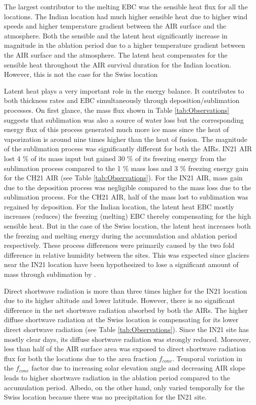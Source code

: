 \documentclass[utf8]{frontiersSCNS} %
\begin{document}
The largest contributor to the melting EBC was the sensible heat flux for all the locations. The Indian location
had much higher sensible heat due to higher wind speeds and higher temperature gradient between the AIR surface
and the atmosphere. Both the sensible and the latent heat significantly increase in magnitude in the ablation
period due to a higher temperature gradient between the AIR surface and the atmosphere. The latent heat
compensates for the sensible heat throughout the AIR survival duration for the Indian location. However, this is
not the case for the Swiss location

Latent heat plays a very important role in the energy balance. It contributes to both thickness rates and EBC
simultaneously through deposition/sublimation processes. On first glance, the mass flux shown in Table
\ref{tab:Observations} suggests that sublimation was also a source of water loss but the corresponding energy
flux of this process generated much more ice mass since the heat of vaporization is around nine times higher
than the heat of fusion. The magnitude of the sublimation process was significantly different for both the AIRs.
IN21 AIR lost 4 \% of its mass input but gained 30 \% of its freezing energy from the sublimation process
compared to the 1 \% mass loss and 3 \% freezing energy gain for the CH21 AIR (see Table
\ref{tab:Observations}). For the IN21 AIR, mass gain due to the deposition process was negligible compared to
the mass loss due to the sublimation process. For the CH21 AIR, half of the mass lost to sublimation was
regained by deposition. For the Indian location, the latent heat EBC mostly increases (reduces) the freezing
(melting) EBC thereby compensating for the high sensible heat. But in the case of the Swiss location, the latent
heat increases both the freezing and melting energy during the accumulation and ablation period respectively.
These process differences were primarily caused by the two fold difference in relative humidity between the
sites.  This was expected since glaciers near the IN21 location have been hypothesized to lose a significant
amount of mass through sublimation by \cite{azam_2018}.

Direct shortwave radiation is more than three times higher for the IN21 location due to its higher altitude and
lower latitude. However, there is no significant difference in the net shortwave radiation absorbed by both the
AIRs. The higher diffuse shortwave radiation at the Swiss location is compensating for its lower direct
shortwave radiation (see Table \ref{tab:Observations}). Since the IN21 site has mostly clear days, its diffuse
shortwave radiation was strongly reduced. Moreover, less than half of the AIR surface area was exposed to direct
shortwave radiation flux for both the locations due to the area fraction $f_{cone}$. Temporal variation in the
$f_{cone}$ factor due to increasing solar elevation angle and decreasing AIR slope leads to higher shortwave
radiation in the ablation period compared to the accumulation period. Albedo, on the other hand, only varied
temporally for the Swiss location because there was no precipitation for the IN21 site.
\end{document}
